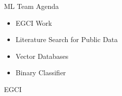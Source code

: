 
\begin{frame}{ML Team Agenda}
    \begin{itemize}
        \item EGCI Work
        \item Literature Search for Public Data
        \item Vector Databases
        \item Binary Classifier
    \end{itemize}
\end{frame}

\begin{frame}{EGCI}
    
\end{frame}

